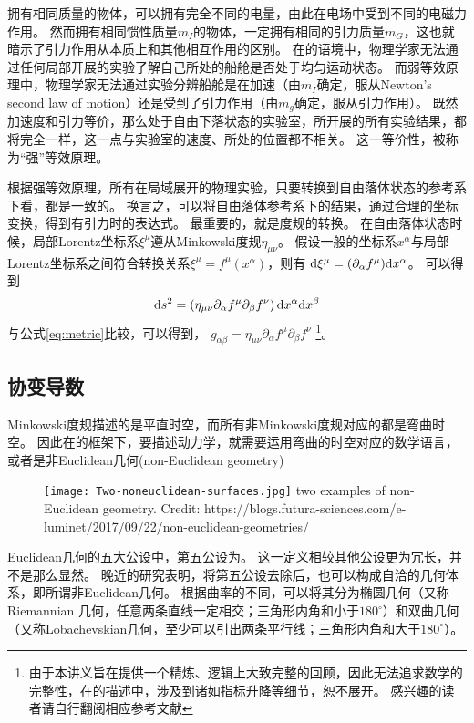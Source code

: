 拥有相同质量的物体，可以拥有完全不同的电量，由此在电场中受到不同的电磁力作用。
然而拥有相同惯性质量$m_I$的物体，一定拥有相同的引力质量$m_G$，这也就暗示了引力作用从本质上和其他相互作用的区别。
在\SR 的语境中，物理学家无法通过任何局部开展的实验了解自己所处的船舱是否处于均匀运动状态。
而弱等效原理中，物理学家无法通过实验分辨船舱是在加速（由$m_I$确定，服从Newton's second law of motion）还是受到了引力作用（由$m_g$确定，服从引力作用）。 既然加速度和引力等价，那么处于自由下落状态的实验室，所开展的所有{}实验结果，都将完全一样，这一点与实验室的速度、所处的位置都不相关。
这一等价性，被称为“强”等效原理。\cite{Schutz:FirstCourse}

根据强等效原理，所有在局域展开的物理实验，只要转换到自由落体状态的参考系下看，都是一致的。
换言之，可以将自由落体参考系下的结果，通过合理的坐标变换，得到有引力时的表达式。
最重要的，就是度规的转换。
在自由落体状态时候，局部Lorentz坐标系$\xi^\mu$遵从Minkowski度规$\eta_{\mu\nu}$。
假设一般的坐标系$x^\alpha$与局部Lorentz坐标系之间符合转换关系$\xi ^\mu= f^\mu (x^\alpha)$，则有 ${\rm d} \xi ^\mu = (\partial_\alpha f^\mu) {\rm d}x^\alpha$。
可以得到 
\begin{equation}\label{eq:STinterval_diff_GR} 
  {\rm d}s^2 = \left( \eta_ {\mu \nu} \partial_\alpha f^\mu \partial_\beta f^\nu\right){\rm d} x^\alpha {\rm d} x^\beta
\end{equation}
与公式\ref{eq:metric}比较，可以得到，
$g_{\alpha\beta} = \eta_ {\mu \nu} \partial_\alpha f^\mu \partial_\beta f^\nu$
\footnote{由于本讲义旨在提供一个精炼、逻辑上大致完整的\GR 回顾，因此无法追求数学的完整性，在\GR 的描述中，涉及到诸如指标升降等细节，恕不展开。
感兴趣的读者请自行翻阅相应参考文献}。

\subsection{协变导数} 
Minkowski度规描述的是平直时空，而所有非Minkowski度规对应的都是弯曲时空。
因此在\GR 的框架下，要描述动力学，就需要运用弯曲的时空对应的数学语言，或者是非Euclidean几何(non-Euclidean geometry)
\begin{figure}[htp]
\centering
\texttt{[image: Two-noneuclidean-surfaces.jpg]}
  {two examples of non-Euclidean geometry. Credit: https://blogs.futura-sciences.com/e-luminet/2017/09/22/non-euclidean-geometries/}
\label{fig:nonEuclidean}
\end{figure}

\begin{myprop}{}{}
  Euclidean几何的五大公设中，第五公设为{}。
  这一定义相较其他公设更为冗长，并不是那么显然。
  晚近的研究表明，将第五公设去除后，也可以构成自洽的几何体系，即所谓非Euclidean几何。
  根据曲率的不同，可以将其分为椭圆几何（又称Riemannian 几何，任意两条直线一定相交；三角形内角和小于$180^\circ$）和双曲几何（又称Lobachevskian几何，至少可以引出两条平行线；三角形内角和大于$180^\circ$）。
\end{myprop}

